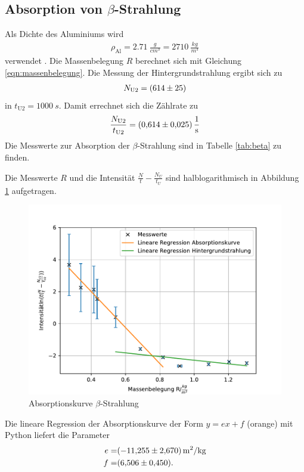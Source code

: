 \subsection{Absorption von $\beta$-Strahlung}
Als Dichte des Aluminiums wird
\begin{align*}
  \rho_{\text{Al}}=\SI{2.71}{\frac{g}{cm^3}}= \SI{2710}{\frac{kg}{m^3}}
\end{align*}
verwendet \cite{2}.
Die Massenbelegung $R$ berechnet sich mit Gleichung \eqref{eqn:massenbelegung}.
Die Messung der Hintergrundstrahlung ergibt sich zu
\begin{align*}
  N_{\text{U2}}= \SI{614 \pm 25}{}
\end{align*}
in $t_{\text{U2}}=\SI{1000}{s}$.
Damit errechnet sich die Zählrate zu
\begin{align*}
  \frac{N_{\text{U2}}}{t_{\text{U2}}}=\SI{0.614 \pm 0.025}{\frac{1}{s}}
\end{align*}
Die Messwerte zur Absorption der $\beta$-Strahlung sind in Tabelle \ref{tab:beta} zu finden.

Die Messwerte $R$ und die Intensität $\frac{N}{t}-\frac{N_{U}}{t_{U}}$ sind halblogarithmisch in Abbildung \ref{fig:beta} aufgetragen.
\begin{figure}[h!]
  \centering
  \includegraphics[width=\textwidth]{beta.pdf}
  \caption{Absorptionskurve $\beta$-Strahlung}
  \label{fig:beta}
\end{figure}
Die lineare Regression der Absorptionskurve der Form $y=ex+f$ (orange) mit Python liefert die Parameter
\begin{align*}
  e=& \SI{-11.255 \pm 2.670}{m^2/kg} \\
  f=& \SI{6.506 \pm 0.450}{}.
\end{align*}

